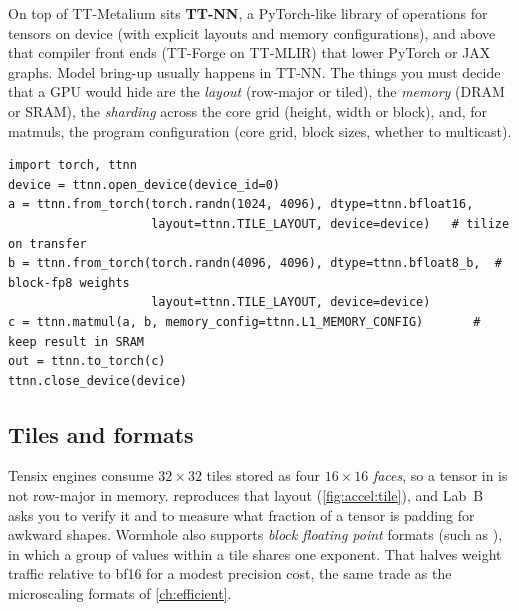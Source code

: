 On top of TT-Metalium sits \textbf{TT-NN}, a PyTorch-like library of operations for tensors on
device (with explicit layouts and memory configurations), and above that compiler front ends
(TT-Forge on TT-MLIR) that lower PyTorch or JAX graphs. Model bring-up usually happens in TT-NN.
The things you must decide that a GPU would hide are the \emph{layout} (row-major or tiled), the
\emph{memory} (DRAM or SRAM), the \emph{sharding} across the core grid (height, width or block),
and, for matmuls, the program configuration (core grid, block sizes, whether to multicast).

\begin{lstlisting}[caption={TT-NN at a glance (illustrative; API as documented around 2025, not run here).},label={lst:accel:ttnn}]
import torch, ttnn
device = ttnn.open_device(device_id=0)
a = ttnn.from_torch(torch.randn(1024, 4096), dtype=ttnn.bfloat16,
                    layout=ttnn.TILE_LAYOUT, device=device)   # tilize on transfer
b = ttnn.from_torch(torch.randn(4096, 4096), dtype=ttnn.bfloat8_b,  # block-fp8 weights
                    layout=ttnn.TILE_LAYOUT, device=device)
c = ttnn.matmul(a, b, memory_config=ttnn.L1_MEMORY_CONFIG)       # keep result in SRAM
out = ttnn.to_torch(c)
ttnn.close_device(device)
\end{lstlisting}

\subsection{Tiles and formats}

Tensix engines consume $32\times32$ tiles stored as four $16\times16$ \emph{faces}, so a tensor in
 is not row-major in memory.  reproduces that
layout (\cref{fig:accel:tile}), and Lab~B asks you to verify it and to measure what fraction of a
tensor is padding for awkward shapes. Wormhole also supports \emph{block floating point} formats
(such as ), in which a group of values within a tile shares one exponent. That
halves weight traffic relative to bf16 for a modest precision cost, the same trade as the
microscaling formats of \cref{ch:efficient}.

